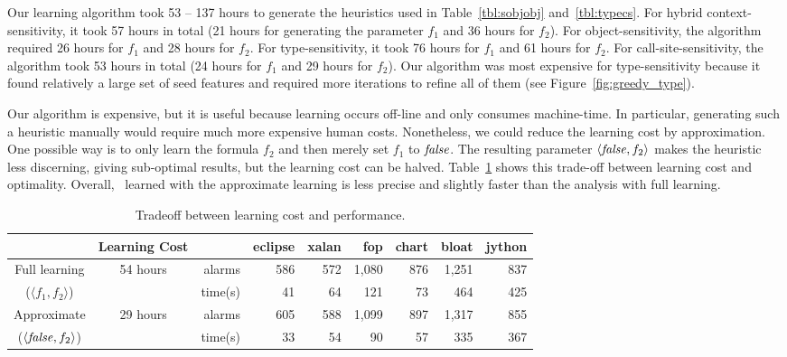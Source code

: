 

Our learning algorithm took 53 -- 137 hours to generate the heuristics
used in Table~\ref{tbl:sobjobj} and~\ref{tbl:typecs}. For hybrid
context-sensitivity, it took 57 hours in total (21 hours for
generating the parameter $f_1$ and 36 hours for $f_2$).  For
object-sensitivity, the algorithm required 26 hours for $f_1$ and 28
hours for $f_2$. For type-sensitivity, it took 76 hours for $f_1$ and
61 hours for $f_2$.  For call-site-sensitivity, the algorithm took 53 hours in total (24 hours for $f_1$ and 29 hours for $f_2$). Our algorithm was most
expensive for type-sensitivity because it found relatively a large set
of seed
features and required more iterations to refine all of them (see
Figure~\ref{fig:greedy_type}). %

Our algorithm is expensive, but it is useful because learning occurs
off-line and only consumes machine-time. In particular, generating
such a heuristic manually would require much more expensive human
costs. Nonetheless, we could reduce the learning cost by
approximation.
One possible way is to only learn the formula $f_2$ and then merely
set $f_1$ to ${\it false}$. The resulting parameter $\langle {\it false}, f_2
\rangle$ makes the heuristic less discerning, giving sub-optimal
results, but the learning cost can be halved.
Table~\ref{tbl:f2} shows this trade-off between learning cost and
optimality.
Overall, \onesobjHT~learned with the approximate learning is less precise and
slightly faster than the analysis with full learning.



\begin{table}[]
\small
\centering
	\caption{Tradeoff between learning cost and performance. %
        }
	\label{tbl:f2}
	\centering
	\begin{tabular}{c c r r r r r r r}
		\toprule
		  &Learning Cost &                          & eclipse & xalan & fop  & chart & bloat & jython \\ \midrule

		 Full learning   & \multirow{2}{*}{54 hours} & alarms & 586     & 572   & 1,080 & 876   & 1,251  & 837    \\
		($\langle f_1,f_2\rangle$)& &time(s)   & 41      & 64    & 121  & 73    & 464   & 425    \\ \midrule
		Approximate  & \multirow{2}{*}{29 hours} &alarms & 605     & 588   & 1,099 & 897   & 1,317  & 855    \\
		($\langle {\it false},f_2\rangle$)&& time(s)   & 33      & 54    & 90   & 57    & 335   & 367    \\ \bottomrule
	\end{tabular}
\end{table}



